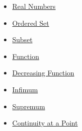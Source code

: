 \begin{dependencies}
\begin{itemize}
  \item \hyperref[def:reals]{Real Numbers}
  \item \hyperref[def:ordered-set]{Ordered Set}
  \item \hyperref[def:subset]{Subset}
  \item \hyperref[def:function]{Function}
  \item \hyperref[def:function-decreasing]{Decreasing Function}
  \item \hyperref[def:infimum]{Infimum}
  \item \hyperref[def:supremum]{Supremum}
  \item \hyperref[def:continuous-at-point]{Continuity at a Point}
\end{itemize}
\end{dependencies}

